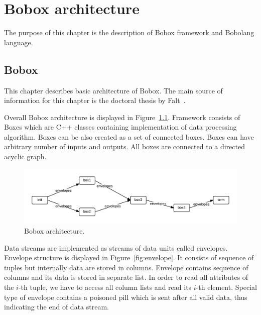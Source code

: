 \chapter{Bobox architecture}
\label{boboxarchitecture}
The purpose of this chapter is the description of Bobox framework and Bobolang language.
\section{Bobox}

This chapter describes basic architecture of Bobox. The main source of information for this chapter is the doctoral thesis by Falt~\cite{faltthesis}. 

Overall Bobox architecture is displayed in Figure~\ref{fig:bobox}. Framework consists of Boxes which are C++ classes containing implementation of data processing algorithm. Boxes can be also created as a set of connected boxes. Boxes can have arbitrary number of inputs and outputs. All boxes are connected to a directed acyclic graph.  

\begin{figure}[h!]
  \centering
    \includegraphics[width=1\textwidth]{bobox}

      \caption{Bobox architecture.}
          \label{fig:bobox}
\end{figure}

Data streams are implemented as streams of data units called envelopes. Envelope structure is displayed in Figure~\ref{fig:envelope}. It consists of sequence of tuples but internally data are stored in columns. Envelope contains sequence of columns and its data is stored in separate list. In order to read all attributes of the $i$-th tuple, we have to access all column lists and read its $i$-th element. Special type of envelope contains a poisoned pill which is sent after all valid data, thus indicating the end of data stream. 


